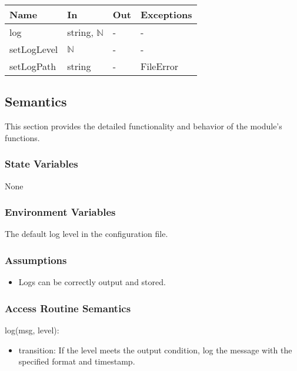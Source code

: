 \documentclass[12pt, titlepage]{article}
\begin{document}
\begin{center}
\begin{tabular}{p{2cm} p{4cm} p{4cm} p{2cm}}
\hline
\textbf{Name} & \textbf{In} & \textbf{Out} & \textbf{Exceptions} \\
\hline
log & string, $\mathbb{N}$ & - & - \\
setLogLevel & $\mathbb{N}$ & - & - \\
setLogPath & string & - & FileError \\
\hline
\end{tabular}
\end{center}

\subsection{Semantics}

This section provides the detailed functionality and behavior of the module’s
functions.

\subsubsection{State Variables}

None

\subsubsection{Environment Variables}

The default log level in the configuration file.

\subsubsection{Assumptions}

\begin{itemize}
\item Logs can be correctly output and stored.
\end{itemize}

\subsubsection{Access Routine Semantics}

\noindent log(msg, level):
\begin{itemize}
\item transition: If the level meets the output condition, log the message with
the specified format and timestamp.
\end{itemize}
\end{document}

